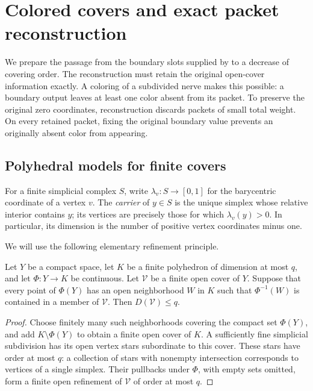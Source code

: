\section{Colored covers and exact packet reconstruction}
\label{sec:cover-reconstruction}

We prepare the passage from the boundary slots supplied by
 to a decrease of covering order.
The reconstruction must retain the original open-cover information
exactly.  A coloring of a subdivided nerve makes this possible: a
boundary output leaves at least one color absent from its packet.
To preserve the original zero coordinates, reconstruction discards
packets of small total weight.  On every retained packet, fixing the
original boundary value prevents an originally absent color from
appearing.

\subsection{Polyhedral models for finite covers}

For a finite simplicial complex $S$, write $\lambda_v:S\to[0,1]$
for the barycentric coordinate of a vertex $v$.  The \emph{carrier}
of $y\in S$ is the unique simplex whose relative interior contains
$y$; its vertices are precisely those for which $\lambda_v(y)>0$.
In particular, its dimension is the number of positive vertex
coordinates minus one.

We will use the following elementary refinement principle.

\begin{lemma}
\label{lem:polyhedral-refinement}
Let $Y$ be a compact space, let $K$ be a finite polyhedron of
dimension at most $q$, and let $\Phi:Y\to K$ be continuous.
Let $\mathcal V$ be a finite open cover of $Y$.  Suppose that every
point of $\Phi(Y)$ has an open neighborhood $W$ in $K$ such that
$\Phi^{-1}(W)$ is contained in a member of $\mathcal V$.
Then $D(\mathcal V)\le q$.
\end{lemma}

\begin{proof}
Choose finitely many such neighborhoods covering the compact set
$\Phi(Y)$, and add $K\setminus\Phi(Y)$ to obtain a finite open
cover of $K$.  A sufficiently fine simplicial subdivision has its
open vertex stars subordinate to this cover.  These stars have order
at most $q$: a collection of stars with nonempty intersection
corresponds to vertices of a single simplex.  Their pullbacks under
$\Phi$, with empty sets omitted, form a finite open refinement of
$\mathcal V$ of order at most $q$.
\end{proof}

